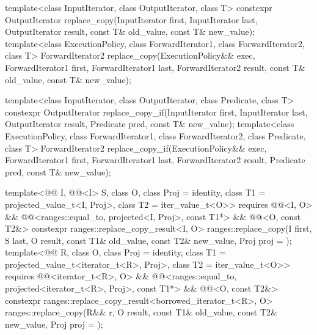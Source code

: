 %
%
\begin{itemdecl}
template<class InputIterator, class OutputIterator, class T>
  constexpr OutputIterator
    replace_copy(InputIterator first, InputIterator last,
                 OutputIterator result,
                 const T& old_value, const T& new_value);
template<class ExecutionPolicy, class ForwardIterator1, class ForwardIterator2, class T>
  ForwardIterator2
    replace_copy(ExecutionPolicy&& exec,
                 ForwardIterator1 first, ForwardIterator1 last,
                 ForwardIterator2 result,
                 const T& old_value, const T& new_value);

template<class InputIterator, class OutputIterator, class Predicate, class T>
  constexpr OutputIterator
    replace_copy_if(InputIterator first, InputIterator last,
                    OutputIterator result,
                    Predicate pred, const T& new_value);
template<class ExecutionPolicy, class ForwardIterator1, class ForwardIterator2,
         class Predicate, class T>
  ForwardIterator2
    replace_copy_if(ExecutionPolicy&& exec,
                    ForwardIterator1 first, ForwardIterator1 last,
                    ForwardIterator2 result,
                    Predicate pred, const T& new_value);

template<@@ I, @@<I> S, class O,
         class Proj = identity, class T1 = projected_value_t<I, Proj>, class T2 = iter_value_t<O>>
  requires @@<I, O> &&
           @@<ranges::equal_to, projected<I, Proj>, const T1*> &&
           @@<O, const T2&>
  constexpr ranges::replace_copy_result<I, O>
    ranges::replace_copy(I first, S last, O result, const T1& old_value, const T2& new_value,
                         Proj proj = {});
template<@@ R, class O, class Proj = identity,
         class T1 = projected_value_t<iterator_t<R>, Proj>, class T2 = iter_value_t<O>>
  requires @@<iterator_t<R>, O> &&
           @@<ranges::equal_to, projected<iterator_t<R>, Proj>, const T1*>
           && @@<O, const T2&>
  constexpr ranges::replace_copy_result<borrowed_iterator_t<R>, O>
    ranges::replace_copy(R&& r, O result, const T1& old_value, const T2& new_value,
                         Proj proj = {});


\end{itemdecl}
